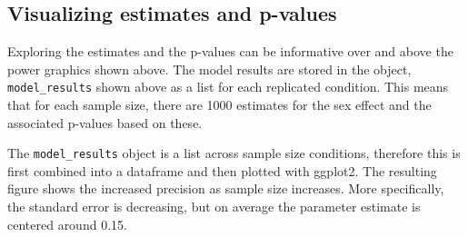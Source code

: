 \documentclass[man,mask,floatsintext]{apa6}
\newenvironment{Shaded}{\begin{snugshade}}{\end{snugshade}}
\newcommand{\DataTypeTok}[1]{\textcolor[rgb]{0.13,0.29,0.53}{#1}}
\newcommand{\DecValTok}[1]{\textcolor[rgb]{0.00,0.00,0.81}{#1}}
\newcommand{\FloatTok}[1]{\textcolor[rgb]{0.00,0.00,0.81}{#1}}
\newcommand{\KeywordTok}[1]{\textcolor[rgb]{0.13,0.29,0.53}{\textbf{#1}}}
\newcommand{\NormalTok}[1]{#1}
\newcommand{\OperatorTok}[1]{\textcolor[rgb]{0.81,0.36,0.00}{\textbf{#1}}}
\newcommand{\StringTok}[1]{\textcolor[rgb]{0.31,0.60,0.02}{#1}}
\begin{document}
\hypertarget{visualizing-estimates-and-p-values}{%
\subsection{Visualizing estimates and p-values}\label{visualizing-estimates-and-p-values}}

Exploring the estimates and the p-values can be informative over and above the power graphics shown above. The model results are stored in the object, \texttt{model\_results} shown above as a list for each replicated condition. This means that for each sample size, there are 1000 estimates for the sex effect and the associated p-values based on these.

The \texttt{model\_results} object is a list across sample size conditions, therefore this is first combined into a dataframe and then plotted with ggplot2. The resulting figure shows the increased precision as sample size increases. More specifically, the standard error is decreasing, but on average the parameter estimate is centered around 0.15.

\begin{Shaded}
\end{Shaded}
\end{document}

